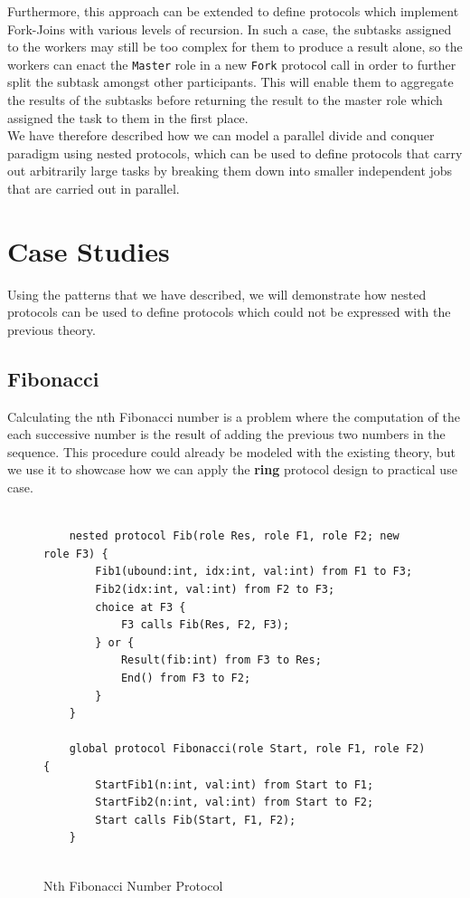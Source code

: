 \documentclass[12pt,twoside]{report}
\begin{document}
Furthermore, this approach can be extended to define protocols which implement Fork-Joins with various levels of recursion. In such a case, the subtasks assigned to the workers may still be too complex for them to produce a result alone, so the workers can enact the \texttt{Master} role in a new \texttt{Fork} protocol call in order to further split the subtask amongst other participants. This will enable them to aggregate the results of the subtasks before returning the result to the master role which assigned the task to them in the first place.\\

We have therefore described how we can model a parallel divide and conquer paradigm using nested protocols, which can be used to define protocols that carry out arbitrarily large tasks by breaking them down into smaller independent jobs that are carried out in parallel.

\section{Case Studies}

Using the patterns that we have described, we will demonstrate how nested protocols can be used to define protocols which could not be expressed with the previous theory.

\subsection{Fibonacci}\label{fibonacci}

Calculating the nth Fibonacci number is a problem where the computation of the each successive number is the result of adding the previous two numbers in the sequence. This procedure could already be modeled with the existing theory\cite{parametrictypes}, but we use it to showcase how we can apply the \textbf{ring} protocol design to practical use case.

\begin{figure}[htb!]
    \centering
    \lstset{language=Scribble}
    \begin{lstlisting}
    
    nested protocol Fib(role Res, role F1, role F2; new role F3) {
        Fib1(ubound:int, idx:int, val:int) from F1 to F3;
        Fib2(idx:int, val:int) from F2 to F3;
        choice at F3 {
            F3 calls Fib(Res, F2, F3);
        } or {
            Result(fib:int) from F3 to Res;
            End() from F3 to F2;
        }
    }
    
    global protocol Fibonacci(role Start, role F1, role F2) {
        StartFib1(n:int, val:int) from Start to F1;
        StartFib2(n:int, val:int) from Start to F2;
        Start calls Fib(Start, F1, F2);
    }
        
    \end{lstlisting}
    \caption{Nth Fibonacci Number Protocol}
    \label{fibonacci-protocol}
\end{figure}
\end{document}
